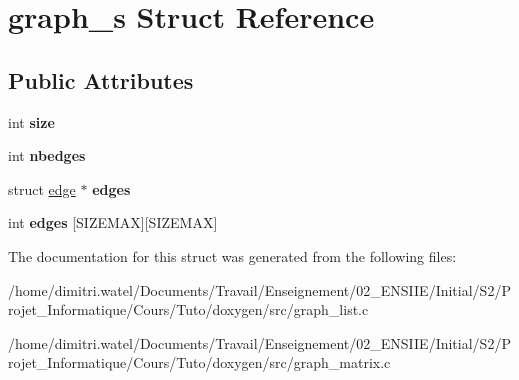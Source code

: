 \hypertarget{structgraph__s}{}\section{graph\+\_\+s Struct Reference}
\label{structgraph__s}
\subsection*{Public Attributes}
\begin{DoxyCompactItemize}
\item 
\mbox{\label{structgraph__s_af392b934667f1a84900a28ad5e653f6d}} 
int {\bfseries size}
\item 
\mbox{\label{structgraph__s_ab79bc0fcf50979e538d2394a9adc5252}} 
int {\bfseries nbedges}
\item 
\mbox{\label{structgraph__s_a982a00ee913105276b0d0f4677b14bcc}} 
struct \hyperlink{structedge}{edge} $\ast$ {\bfseries edges}
\item 
\mbox{\label{structgraph__s_a27c2ad0e625b13788b1d1b08591c9518}} 
int {\bfseries edges} \mbox{[}S\+I\+Z\+E\+M\+AX\mbox{]}\mbox{[}S\+I\+Z\+E\+M\+AX\mbox{]}
\end{DoxyCompactItemize}


The documentation for this struct was generated from the following files\+:\begin{DoxyCompactItemize}
\item 
/home/dimitri.\+watel/\+Documents/\+Travail/\+Enseignement/02\+\_\+\+E\+N\+S\+I\+I\+E/\+Initial/\+S2/\+Projet\+\_\+\+Informatique/\+Cours/\+Tuto/doxygen/src/graph\+\_\+list.\+c\item 
/home/dimitri.\+watel/\+Documents/\+Travail/\+Enseignement/02\+\_\+\+E\+N\+S\+I\+I\+E/\+Initial/\+S2/\+Projet\+\_\+\+Informatique/\+Cours/\+Tuto/doxygen/src/graph\+\_\+matrix.\+c\end{DoxyCompactItemize}
